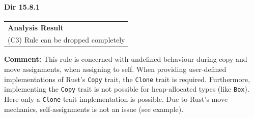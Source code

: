 \paragraph{Dir 15.8.1}
\begin{longtable}{p{13cm}}
\textbf{Analysis Result} \\
(C3) Rule can be dropped completely \\
\end{longtable}
\textbf{Comment:} This rule is concerned with undefined behaviour during copy and move assignments, when assigning to self. When providing user-defined implementations of Rust's \texttt{Copy} trait, the \texttt{Clone} trait is required. Furthermore, implementing the \texttt{Copy} trait is not possible for heap-allocated types (like \texttt{Box}). Here only a \texttt{Clone} trait implementation is possible. Due to Rust's move mechanics, self-assignments is not an issue (see example). \\


